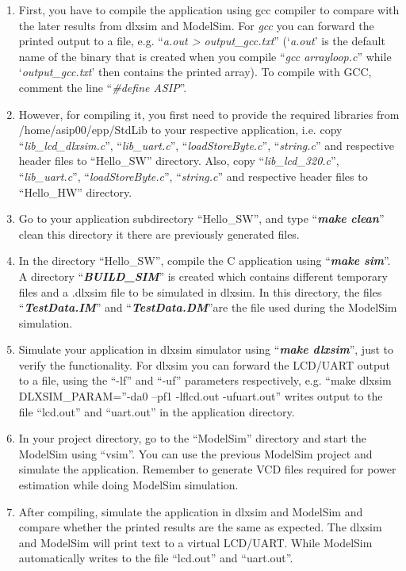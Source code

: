 \documentclass[
]{article}
\begin{document}
\begin{enumerate}
  \begin{enumerate}
  \def\labelenumii{\arabic{enumii}.}
  \item
    First, you have to compile the application using gcc compiler to
    compare with the later results from dlxsim and ModelSim. For
    \emph{gcc} you can forward the printed output to a file, e.g.
    ``\emph{a.out \textgreater{} output\_gcc.txt}'' (`\emph{a.out}' is
    the default name of the binary that is created when you compile
    ``\emph{gcc arrayloop.c}'' while `\emph{output\_gcc.txt}' then
    contains the printed array). To compile with GCC, comment the line
    ``\emph{\#define ASIP}''.
  \item
    However, for compiling it, you first need to provide the required
    libraries from /home/asip00/epp/StdLib to your respective
    application, i.e. copy ``\emph{lib\_lcd\_dlxsim.c}'',
    ``\emph{lib\_uart.c}'', ``\emph{loadStoreByte.c}'',
    ``\emph{string.c}'' and respective header files to ``Hello\_SW''
    directory. Also, copy ``\emph{lib\_lcd\_320.c}'',
    ``\emph{lib\_uart.c}'', ``\emph{loadStoreByte.c}'',
    ``\emph{string.c}'' and respective header files to ``Hello\_HW''
    directory.
  \item
    Go to your application subdirectory ``Hello\_SW'', and type
    ``\emph{\textbf{make clean}}'' clean this directory it there are
    previously generated files.
  \item
    In the directory ``Hello\_SW'', compile the C application using
    ``\emph{\textbf{make sim}}''. A directory
    ``\emph{\textbf{BUILD\_SIM}}'' is created which contains different
    temporary files and a .dlxsim file to be simulated in dlxsim. In
    this directory, the files ``\emph{\textbf{TestData.IM}}'' and
    ``\emph{\textbf{TestData.DM}}''are the file used during the ModelSim
    simulation.
  \item
    Simulate your application in dlxsim simulator using
    ``\emph{\textbf{make dlxsim}}'', just to verify the functionality.
    For dlxsim you can forward the LCD/UART output to a file, using the
    ``-lf'' and ``-uf'' parameters respectively, e.g. ``make dlxsim
    DLXSIM\_PARAM=''-da0 --pf1 -lflcd.out -ufuart.out'' writes output to
    the file ``lcd.out'' and ``uart.out'' in the application directory.
  \item
    In your project directory, go to the ``ModelSim'' directory and
    start the ModelSim using ``vsim''. You can use the previous ModelSim
    project and simulate the application. Remember to generate VCD files
    required for power estimation while doing ModelSim simulation.
  \item
    After compiling, simulate the application in dlxsim and ModelSim and
    compare whether the printed results are the same as expected. The
    dlxsim and ModelSim will print text to a virtual LCD/UART. While
    ModelSim automatically writes to the file ``lcd.out'' and
    ``uart.out''.
  \end{enumerate}


\end{enumerate}
\end{document}

